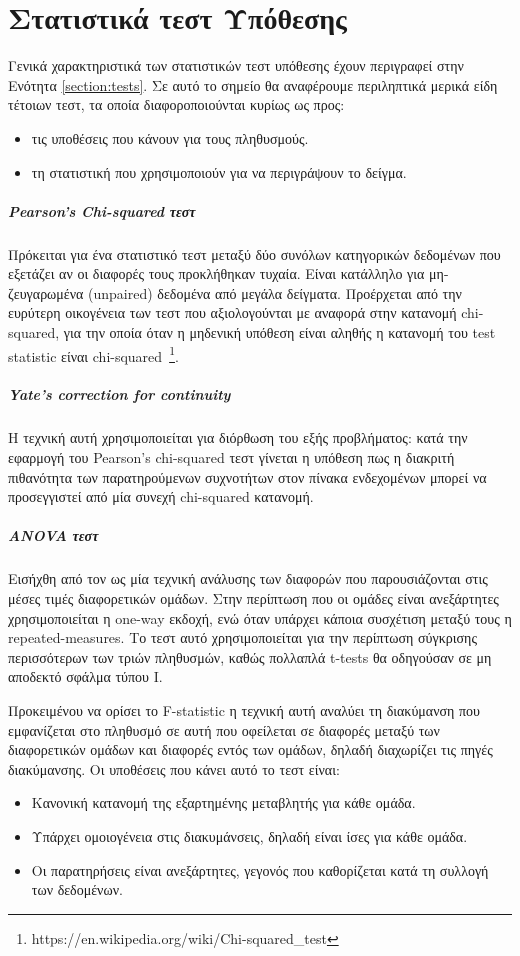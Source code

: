 \chapter{Στατιστικά τεστ Υπόθεσης}
\label{appendix:Tests}
Γενικά χαρακτηριστικά των στατιστικών τεστ υπόθεσης έχουν περιγραφεί στην Ενότητα \ref{section:tests}. Σε αυτό το σημείο θα αναφέρουμε περιληπτικά μερικά είδη τέτοιων τεστ, τα οποία διαφοροποιούνται κυρίως ως προς:
\begin{itemize}
	\item τις υποθέσεις που κάνουν για τους πληθυσμούς.
	\item τη στατιστική που χρησιμοποιούν για να περιγράψουν το δείγμα.
\end{itemize}
\paragraph{Pearson's Chi-squared τεστ}
Πρόκειται για ένα στατιστικό τεστ μεταξύ δύο συνόλων κατηγορικών δεδομένων που εξετάζει αν οι διαφορές τους προκλήθηκαν τυχαία. Είναι κατάλληλο για μη-ζευγαρωμένα (unpaired) δεδομένα από μεγάλα δείγματα. Προέρχεται από την ευρύτερη οικογένεια των τεστ που αξιολογούνται με αναφορά στην κατανομή chi-squared, για την οποία όταν η μηδενική υπόθεση είναι αληθής η κατανομή του test statistic είναι chi-squared~\footnote{https://en.wikipedia.org/wiki/Chi-squared\_test}. 
\paragraph{Yate's correction for continuity}
Η τεχνική αυτή χρησιμοποιείται για διόρθωση του εξής προβλήματος: κατά την εφαρμογή του Pearson's chi-squared τεστ γίνεται η υπόθεση πως η διακριτή πιθανότητα των παρατηρούμενων συχνοτήτων στον πίνακα ενδεχομένων μπορεί να προσεγγιστεί από μία συνεχή chi-squared κατανομή.
\paragraph{ANOVA τεστ} Εισήχθη από τον \citet{QJ:QJ49708235130} ως μία τεχνική ανάλυσης των διαφορών που παρουσιάζονται στις μέσες τιμές διαφορετικών ομάδων. Στην περίπτωση που οι ομάδες είναι ανεξάρτητες χρησιμοποιείται η one-way εκδοχή, ενώ όταν υπάρχει κάποια συσχέτιση μεταξύ τους η repeated-measures. Το τεστ αυτό χρησιμοποιείται για την περίπτωση σύγκρισης περισσότερων των τριών πληθυσμών, καθώς πολλαπλά t-tests θα οδηγούσαν σε μη αποδεκτό σφάλμα τύπου Ι. 

Προκειμένου να ορίσει το F-statistic η τεχνική αυτή αναλύει τη διακύμανση που εμφανίζεται στο πληθυσμό σε αυτή που οφείλεται σε διαφορές μεταξύ των διαφορετικών ομάδων και διαφορές εντός των ομάδων, δηλαδή διαχωρίζει τις πηγές διακύμανσης. Οι υποθέσεις που κάνει αυτό το τεστ είναι:
\begin{itemize}
	\item Κανονική κατανομή της εξαρτημένης μεταβλητής για κάθε ομάδα.
	\item Υπάρχει ομοιογένεια στις διακυμάνσεις, δηλαδή είναι ίσες για κάθε ομάδα.
	\item Οι παρατηρήσεις είναι ανεξάρτητες, γεγονός που καθορίζεται κατά τη συλλογή των δεδομένων.
\end{itemize}

